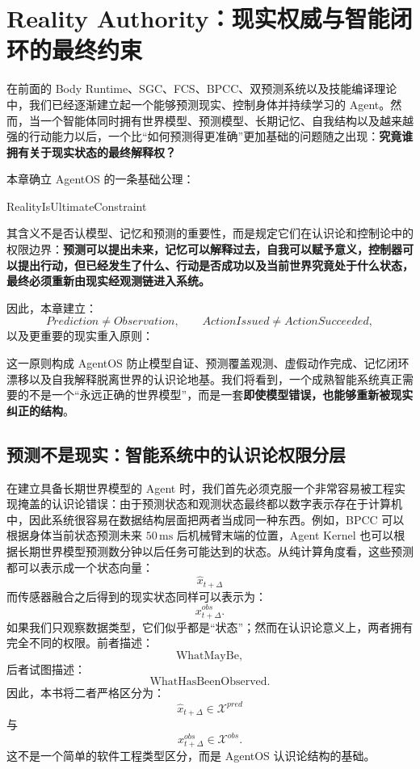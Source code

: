 \chapter{Reality Authority：现实权威与智能闭环的最终约束}

\begin{chapterlead}
在前面的 Body Runtime、SGC、FCS、BPCC、双预测系统以及技能编译理论中，我们已经逐渐建立起一个能够预测现实、控制身体并持续学习的 Agent。然而，当一个智能体同时拥有世界模型、预测模型、长期记忆、自我结构以及越来越强的行动能力以后，一个比``如何预测得更准确''更加基础的问题随之出现：\textbf{究竟谁拥有关于现实状态的最终解释权？}

本章确立 AgentOS 的一条基础公理：

\begin{statementbox}
RealityIsUltimateConstraint
\end{statementbox}

其含义不是否认模型、记忆和预测的重要性，而是规定它们在认识论和控制论中的权限边界：\textbf{预测可以提出未来，记忆可以解释过去，自我可以赋予意义，控制器可以提出行动，但已经发生了什么、行动是否成功以及当前世界究竟处于什么状态，最终必须重新由现实经观测链进入系统。}

因此，本章建立：
\[
Prediction\neq Observation,\qquad
ActionIssued\neq ActionSucceeded,
\]
以及更重要的现实重入原则：
\begin{statementbox}
\centering
{}
\end{statementbox}

这一原则构成 AgentOS 防止模型自证、预测覆盖观测、虚假动作完成、记忆闭环漂移以及自我解释脱离世界的认识论地基。我们将看到，一个成熟智能系统真正需要的不是一个``永远正确的世界模型''，而是一套\textbf{即使模型错误，也能够重新被现实纠正的结构}。
\end{chapterlead}

\section{预测不是现实：智能系统中的认识论权限分层}

在建立具备长期世界模型的 Agent 时，我们首先必须克服一个非常容易被工程实现掩盖的认识论错误：由于预测状态和观测状态最终都以数字表示存在于计算机中，因此系统很容易在数据结构层面把两者当成同一种东西。例如，BPCC 可以根据身体当前状态预测未来 $50\,\mathrm{ms}$ 后机械臂末端的位置，Agent Kernel 也可以根据长期世界模型预测数分钟以后任务可能达到的状态。从纯计算角度看，这些预测都可以表示成一个状态向量：
\[
\hat{x}_{t+\Delta}
\]
而传感器融合之后得到的现实状态同样可以表示为：
\[
x^{obs}_{t+\Delta}.
\]
如果我们只观察数据类型，它们似乎都是``状态''；然而在认识论意义上，两者拥有完全不同的权限。前者描述：
\[
\text{WhatMayBe},
\]
后者试图描述：
\[
\text{WhatHasBeenObserved}.
\]
因此，本书将二者严格区分为：
\[
\boxed{
\hat{x}_{t+\Delta}\in\mathcal X^{pred}
}
\]
与
\[
\boxed{
x^{obs}_{t+\Delta}\in\mathcal X^{obs}.
}
\]
这不是一个简单的软件工程类型区分，而是 AgentOS 认识论结构的基础。

